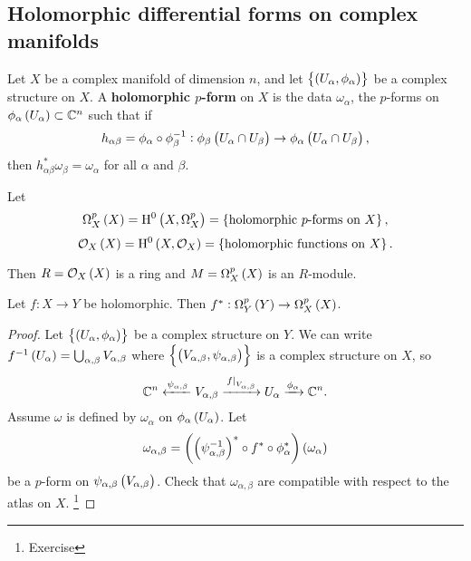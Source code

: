 \pagebreak

\subsection{Holomorphic differential forms on complex manifolds}

\begin{definition}
Let $ X $ be a complex manifold of dimension $ n $, and let $ \cbr{\br{U_\alpha, \phi_\alpha}} $ be a complex structure on $ X $. A \textbf{holomorphic $ p $-form} on $ X $ is the data $ \omega_\alpha $, the $ p $-forms on $ \phi_\alpha\br{U_\alpha} \subset \CC^n $ such that if
$$ h_{\alpha\beta} = \phi_\alpha \circ \phi_\beta^{-1} : \phi_\beta\br{U_\alpha \cap U_\beta} \to \phi_\alpha\br{U_\alpha \cap U_\beta}, $$
then $ h_{\alpha\beta}^*\omega_\beta = \omega_\alpha $ for all $ \alpha $ and $ \beta $.
\end{definition}


\begin{notation}
Let
$$ \Omega_X^p\br{X} = \H^0\br{X, \Omega_X^p} = \cbr{\text{holomorphic $ p $-forms on} \ X}, $$
$$ \OOO_X\br{X} = \H^0\br{X, \OOO_X} = \cbr{\text{holomorphic functions on} \ X}. $$
\end{notation}

Then $ R = \OOO_X\br{X} $ is a ring and $ M = \Omega_X^p\br{X} $ is an $ R $-module.

\begin{lemma}
Let $ f : X \to Y $ be holomorphic. Then $ f^* : \Omega_Y^p\br{Y} \to \Omega_X^p\br{X} $.
\end{lemma}

\begin{proof}
Let $ \cbr{\br{U_\alpha, \phi_\alpha}} $ be a complex structure on $ Y $. We can write $ f^{-1}\br{U_\alpha} = \bigcup_{\alpha, \beta} V_{\alpha, \beta} $ where $ \cbr{\br{V_{\alpha, \beta}, \psi_{\alpha, \beta}}} $ is a complex structure on $ X $, so
$$ \mathbb{C}^n \xleftarrow{\psi_{\alpha, \beta}} V_{\alpha, \beta} \xrightarrow{\left. f \right|_{V_{\alpha, \beta}}} U_\alpha \xrightarrow{\phi_\alpha} \mathbb{C}^n. $$
Assume $ \omega $ is defined by $ \omega_\alpha $ on $ \phi_\alpha\br{U_\alpha} $. Let
$$ \omega_{\alpha, \beta} = \br{\br{\psi_{\alpha, \beta}^{-1}}^* \circ f^* \circ \phi_\alpha^*}\br{\omega_\alpha} $$
be a $ p $-form on $ \psi_{\alpha, \beta}\br{V_{\alpha, \beta}} $. Check that $ \omega_{\alpha, \beta} $ are compatible with respect to the atlas on $ X $. \footnote{Exercise}
\end{proof}

